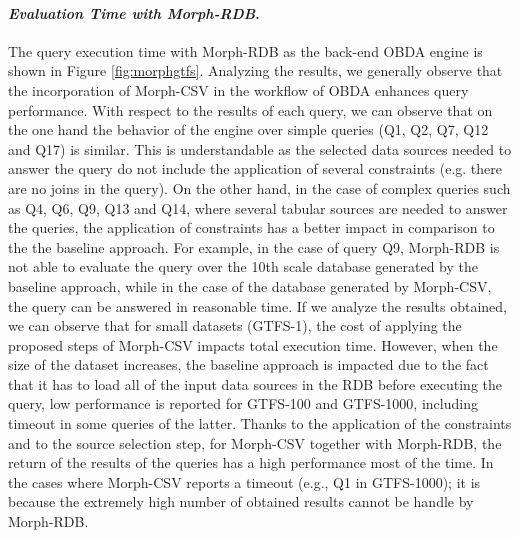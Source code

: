 \noindent\paragraph*{\textit{Evaluation Time with Morph-RDB}.}
The query execution time with Morph-RDB as the back-end OBDA engine is shown in Figure \ref{fig:morphgtfs}. Analyzing the results, we generally observe that the incorporation of Morph-CSV in the workflow of OBDA enhances query performance. With respect to the results of each query, we can observe that on the one hand the behavior of the engine over simple queries (Q1, Q2, Q7, Q12 and Q17) is similar. This is understandable as the selected data sources needed to answer the query do not include the application of several constraints (e.g. there are no joins in the query). On the other hand, in the case of complex queries such as Q4, Q6, Q9, Q13 and Q14, where  several tabular sources are needed to answer the queries, the application of constraints has a better impact in comparison to the the baseline approach. For example, in the case of query Q9, Morph-RDB is not able to evaluate the query over the 10th scale database generated by the baseline approach, while in the case of the database generated by Morph-CSV, the query can be answered in reasonable time. If we analyze the results obtained, we can observe that for small datasets (GTFS-1), the cost of applying the proposed steps of Morph-CSV impacts total execution time. However, when the size of the dataset increases, the baseline approach is impacted due to the fact that it has to load all of the input data sources in the RDB before executing the query, low performance is reported for GTFS-100 and GTFS-1000, including timeout in some queries of the latter. Thanks to the application of the constraints and to the source selection step, for Morph-CSV together with Morph-RDB, the return of the results of the queries has a high performance most of the time. In the cases where Morph-CSV reports a timeout (e.g., Q1 in GTFS-1000); it is because the extremely high number of obtained results cannot be handle by Morph-RDB.

